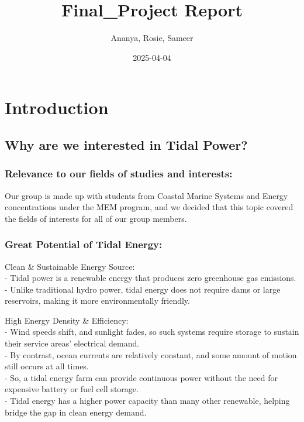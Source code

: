\documentclass[
]{article}
\title{Final\_Project Report}
\author{Ananya, Rosie, Sameer}
\date{2025-04-04}
\begin{document}
\maketitle

\section{Introduction}\label{introduction}

\subsection{Why are we interested in Tidal
Power?}\label{why-are-we-interested-in-tidal-power}

\subsubsection{Relevance to our fields of studies and
interests:}\label{relevance-to-our-fields-of-studies-and-interests}

Our group is made up with students from Coastal Marine Systems and
Energy concentrations under the MEM program, and we decided that this
topic covered the fields of interests for all of our group members.

\subsubsection{Great Potential of Tidal
Energy:}\label{great-potential-of-tidal-energy}

Clean \& Sustainable Energy Source:\\
- Tidal power is a renewable energy that produces zero greenhouse gas
emissions. - Unlike traditional hydro power, tidal energy does not
require dams or large reservoirs, making it more environmentally
friendly.

High Energy Density \& Efficiency:\\
- Wind speeds shift, and sunlight fades, so such systems require storage
to sustain their service areas' electrical demand.\\
- By contrast, ocean currents are relatively constant, and some amount
of motion still occurs at all times.\\
- So, a tidal energy farm can provide continuous power without the need
for expensive battery or fuel cell storage.\\
- Tidal energy has a higher power capacity than many other renewable,
helping bridge the gap in clean energy demand.
\end{document}
